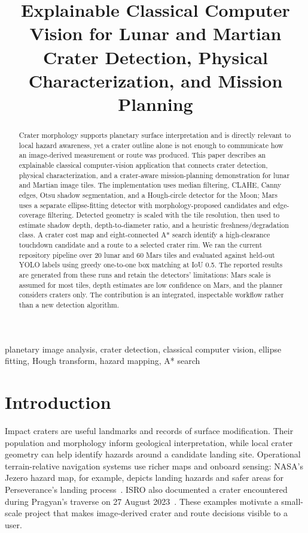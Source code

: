 \documentclass[conference]{IEEEtran}
\begin{document}
\title{Explainable Classical Computer Vision for Lunar and Martian Crater Detection, Physical Characterization, and Mission Planning}
\author{}
\maketitle

\begin{abstract}
Crater morphology supports planetary surface interpretation and is directly relevant to local hazard awareness, yet a crater outline alone is not enough to communicate how an image-derived measurement or route was produced. This paper describes an explainable classical computer-vision application that connects crater detection, physical characterization, and a crater-aware mission-planning demonstration for lunar and Martian image tiles. The implementation uses median filtering, CLAHE, Canny edges, Otsu shadow segmentation, and a Hough-circle detector for the Moon; Mars uses a separate ellipse-fitting detector with morphology-proposed candidates and edge-coverage filtering. Detected geometry is scaled with the tile resolution, then used to estimate shadow depth, depth-to-diameter ratio, and a heuristic freshness/degradation class. A crater cost map and eight-connected A* search identify a high-clearance touchdown candidate and a route to a selected crater rim. We ran the current repository pipeline over 20 lunar and 60 Mars tiles and evaluated against held-out YOLO labels using greedy one-to-one box matching at IoU 0.5. The reported results are generated from these runs and retain the detectors' limitations: Mars scale is assumed for most tiles, depth estimates are low confidence on Mars, and the planner considers craters only. The contribution is an integrated, inspectable workflow rather than a new detection algorithm.
\end{abstract}
\begin{IEEEkeywords}
planetary image analysis, crater detection, classical computer vision, ellipse fitting, Hough transform, hazard mapping, A* search
\end{IEEEkeywords}

\section{Introduction}
Impact craters are useful landmarks and records of surface modification. Their population and morphology inform geological interpretation, while local crater geometry can help identify hazards around a candidate landing site. Operational terrain-relative navigation systems use richer maps and onboard sensing: NASA's Jezero hazard map, for example, depicts landing hazards and safer areas for Perseverance's landing process~\cite{jplJezero}. ISRO also documented a crater encountered during Pragyan's traverse on 27 August 2023~\cite{isroPragyan}. These examples motivate a small-scale project that makes image-derived crater and route decisions visible to a user.
\end{document}
